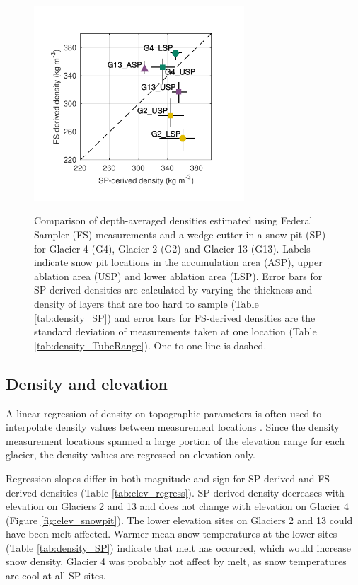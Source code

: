 \documentclass{sfuthesis}
\begin{document}
\begin{figure}
	\centering
	\includegraphics[width =0.7\textwidth]{SPvsFS.pdf}\\
	\caption{Comparison of depth-averaged densities estimated using Federal Sampler (FS) measurements and  a wedge cutter in a snow pit (SP)  for Glacier 4 (G4), Glacier 2 (G2) and Glacier 13 (G13). Labels indicate snow pit locations in the accumulation area (ASP), upper ablation area (USP) and lower ablation area (LSP). Error bars for SP-derived densities are calculated by varying the thickness and density of layers that are too hard to sample (Table \ref{tab:density_SP}) and error bars for FS-derived densities are the standard deviation of measurements taken at one location (Table \ref{tab:density_TubeRange}). One-to-one line is dashed.}
	\label{fig:density_pitVStube}
\end{figure}


\subsection{Density and elevation}

A linear regression of density on topographic parameters is often used to interpolate density values between measurement locations \citep[e.g.][]{Elder1998, Molotch2005,Wetlaufer2016}. Since the density measurement locations spanned a large portion of the elevation range for each glacier, the density values are regressed on elevation only. 

Regression slopes differ in both magnitude and sign for SP-derived and FS-derived densities (Table \ref{tab:elev_regress}). SP-derived density decreases with elevation on Glaciers 2 and 13 and does not change with elevation on Glacier 4 (Figure \ref{fig:elev_snowpit}). The lower elevation sites on Glaciers 2 and 13 could have been melt affected. Warmer mean snow temperatures at the lower sites (Table \ref{tab:density_SP}) indicate that melt has occurred, which would increase snow density. Glacier 4 was probably not affect by melt, as snow temperatures are cool at all SP sites. 
\end{document}
